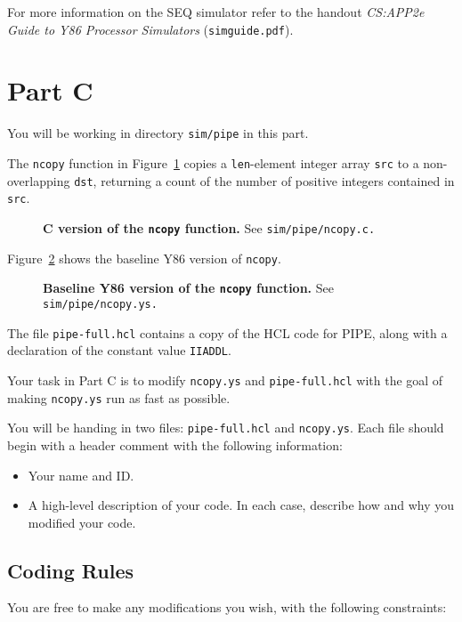 \documentclass[11pt]{article}
\newcommand{\mycaption}[2]{\caption[#1]{\small \textsf{\textbf{#1} #2}}}
\newenvironment{ccode}%
{\small}%
{}
\begin{document}
For more information on the SEQ simulator refer to the handout
\textit{CS:APP2e Guide to Y86 Processor Simulators} (\texttt{simguide.pdf}).

\section{Part C}

You will be working in directory \texttt{sim/pipe} in this part.

The \texttt{ncopy} function in Figure~\ref{fig:ncopyc} copies a
\texttt{len}-element integer array \texttt{src} to a non-overlapping
\texttt{dst}, returning a count of the number of positive integers
contained in \texttt{src}.
\begin{figure}
\begin{ccode}

\end{ccode}
\mycaption{C version of the \texttt{ncopy} function.}{See \texttt{sim/pipe/ncopy.c.}}
\label{fig:ncopyc}
\end{figure}
Figure~\ref{fig:ncopys} shows the baseline Y86 version of \texttt{ncopy}. 
\begin{figure}
\begin{ccode}

\end{ccode}
\mycaption{Baseline Y86 version of the \texttt{ncopy} function.}{See \texttt{sim/pipe/ncopy.ys.}}
\label{fig:ncopys}
\end{figure}
The file \texttt{pipe-full.hcl} contains a copy of the HCL
code for PIPE, along with a declaration of the constant value \texttt{IIADDL}.

Your task in Part C is to modify \texttt{ncopy.ys} and
\texttt{pipe-full.hcl} with the goal of making \texttt{ncopy.ys} run
as fast as possible.

You will be handing in two files: \texttt{pipe-full.hcl} and 
\texttt{ncopy.ys}. Each file should begin with a header comment
with the following information:
\begin{itemize}
\item Your name and ID.
\item A high-level description of your code. In each case, describe
how and why you modified your code.
\end{itemize}

\subsection*{Coding Rules}

You are free to make any modifications you wish, with the following
constraints:
\end{document}
